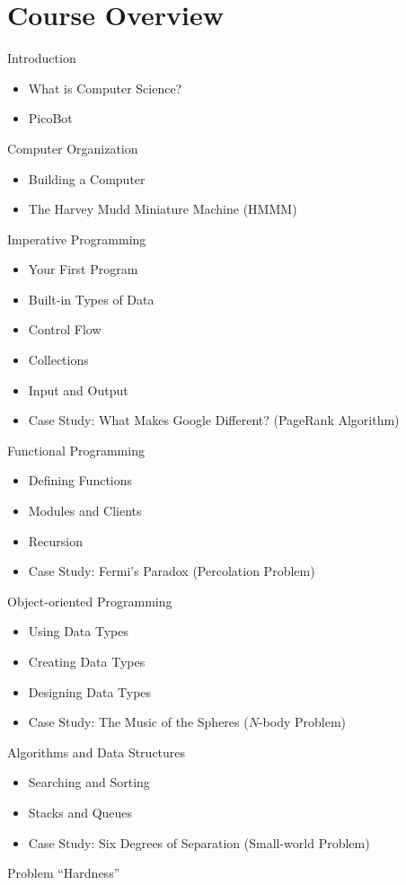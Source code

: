 \documentclass[8pt,a4paper,compress,handout]{beamer}
\begin{document}
\section{Course Overview}

\begin{frame}[fragile]
\pause
Introduction
\begin{itemize}
\item What is Computer Science?
\item PicoBot
\end{itemize}

\smallskip
\pause

Computer Organization
\begin{itemize}
\item Building a Computer
\item The Harvey Mudd Miniature Machine (HMMM)
\end{itemize}

\smallskip
\pause

Imperative Programming
\begin{itemize}
\item Your First Program
\item Built-in Types of Data
\item Control Flow
\item Collections
\item Input and Output
\item Case Study: What Makes Google Different? (PageRank Algorithm)
\end{itemize}
\end{frame}

\begin{frame}[fragile]
\pause
Functional Programming
\begin{itemize}
\item Defining Functions
\item Modules and Clients
\item Recursion
\item Case Study: Fermi's Paradox (Percolation Problem)
\end{itemize}

\bigskip
\pause

Object-oriented Programming
\begin{itemize}
\item Using Data Types
\item Creating Data Types
\item Designing Data Types
\item Case Study: The Music of the Spheres ($N$-body Problem)
\end{itemize}

\bigskip
\pause

Algorithms and Data Structures
\begin{itemize}
\item Searching and Sorting
\item Stacks and Queues
\item Case Study: Six Degrees of Separation (Small-world Problem)
\end{itemize}

\bigskip
\pause

Problem ``Hardness''
\end{frame}
\end{document}
